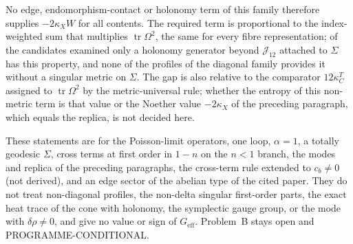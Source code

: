 No edge, endomorphism-contact or holonomy term of this family therefore supplies \(-2\kappa_X W\) for all contents. The required term is proportional to the index-weighted sum that multiplies \(\operatorname{tr}\Omega^2\), the same for every fibre representation; of the candidates examined only a holonomy generator beyond \(\mathcal J_{12}\) attached to \(\Sigma\) has this property, and none of the profiles of the diagonal family provides it without a singular metric on \(\Sigma\). The gap is also relative to the comparator \(12\kappa_C^T\) assigned to \(\operatorname{tr}\Omega^2\) by the metric-universal rule; whether the entropy of this non-metric term is that value or the Noether value \(-2\kappa_X\) of the preceding paragraph, which equals the replica, is not decided here.

These statements are for the Poisson-limit operators, one loop, \(\alpha=1\), a totally geodesic \(\Sigma\), cross terms at first order in \(1-n\) on the \(n<1\) branch, the modes and replica of the preceding paragraphs, the cross-term rule extended to \(c_b\neq0\) (not derived), and an edge sector of the abelian type of the cited paper. They do not treat non-diagonal profiles, the non-delta singular first-order parts, the exact heat trace of the cone with holonomy, the symplectic gauge group, or the mode with \(\delta\rho\neq0\), and give no value or sign of \(G_{\mathrm{eff}}\). Problem~B stays open and PROGRAMME-CONDITIONAL.
